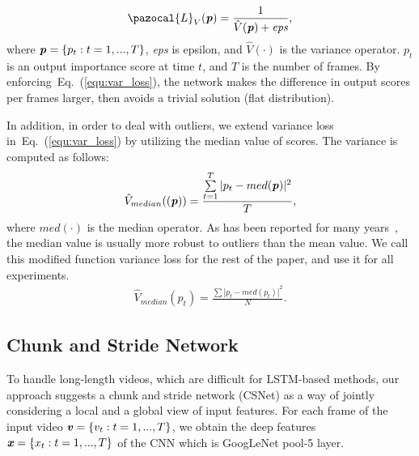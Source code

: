 \documentclass[letterpaper]{article} \usepackage{aaai19}  \usepackage{times}  \usepackage{helvet}  \usepackage{courier}  \usepackage{url}  \usepackage{graphicx}  \frenchspacing  \setlength{\pdfpagewidth}{8.5in}  \setlength{\pdfpageheight}{11in}
\newcommand{\Lb}{\pazocal{L}}
\newcommand{\eqnref}[1]{Eq.~(\ref{#1})}
\begin{document}
\begin{eqnarray}
\Lb_{V}(\textbf{\textit{p}}) = \frac{1}{\hat{V}(\textbf{\textit{p}}) + \textit{eps}},
\label{equ:var_loss}
\end{eqnarray}
where $\textbf{\textit{p}}= \left \{ p_{t} : t = 1,..., T \right \}$, \textit{eps} is epsilon, and $\hat{V}$$(\cdot)$ is the variance operator. $p_t$ is an output importance score at time $t$, and $T$ is the number of frames. By enforcing~\eqnref{equ:var_loss}, the network makes the difference in output scores per frames larger, then avoids a trivial solution (flat distribution).

In addition, in order to deal with outliers, we extend variance loss in~\eqnref{equ:var_loss} by utilizing the median value of scores. The variance is computed as follows:
\begin{eqnarray}
\hat{V}_{median}((\textbf{\textit{p}})) =  \frac{\sum \limits_{t=1}^{T} {|p_t - med(\textbf{\textit{p}})|^2}}{T},
\label{equ:var_loss_med}
\end{eqnarray}
where $med(\cdot)$ is the median operator. As has been reported for many years~\cite{Pratt1975medianfilter,Huang1979median,Zhang2014Wmedian}, the median value is usually more robust to outliers than the mean value. We call this modified function variance loss for the rest of the paper, and use it for all experiments.
\begin{eqnarray}
\hat{V}_{median}(p_t) =  \frac{\sum{|p_t - med(p_t)|^2}}{N}.
\label{equ:var_loss_med}
\end{eqnarray}
\fi

\subsection{Chunk and Stride Network}
To handle long-length videos, which are difficult for LSTM-based methods, our approach suggests a chunk and stride network (CSNet) as a way of jointly considering a local and a global view of input features. For each frame of the input video $\textbf{\textit{v}}= \left \{ v_{t} : t = 1,..., T \right \}$, we obtain the deep features $\textbf{\textit{x}}= \left \{ x_{t} : t = 1,..., T \right \}$ of the CNN which is GoogLeNet pool-5 layer.
\end{document}
